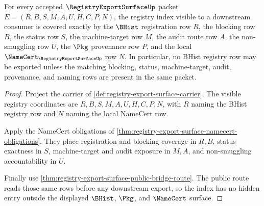 \begin{theorem}
\label{thm:registryexportsurface-index-coverage}
For every accepted $\RegistryExportSurfaceUp$ packet $E=(R,B,S,M,A,U,H,C,P,N)$, the registry index visible to a downstream consumer is covered exactly by the $\BHist$ registration row $R$, the blocking row $B$, the status row $S$, the machine-target row $M$, the audit route row $A$, the non-smuggling row $U$, the $\Pkg$ provenance row $P$, and the local $\NameCert_{\RegistryExportSurfaceUp}$ row $N$. In particular, no BHist registry row may be exported unless the matching blocking, status, machine-target, audit, provenance, and naming rows are present in the same packet.
\end{theorem}
\begin{proof}
Project the carrier of \autoref{def:registry-export-surface-carrier}. The visible registry coordinates are $R,B,S,M,A,U,H,C,P,N$, with $R$ naming the BHist registry row and $N$ naming the local NameCert row.

Apply the NameCert obligations of \autoref{thm:registry-export-surface-namecert-obligations}. They place registration and blocking coverage in $R,B$, status exactness in $S$, machine-target and audit exposure in $M,A$, and non-smuggling accountability in $U$.

Finally use \autoref{thm:registry-export-surface-public-bridge-route}. The public route reads those same rows before any downstream export, so the index has no hidden entry outside the displayed $\BHist$, $\Pkg$, and $\NameCert$ surface.
\end{proof}

